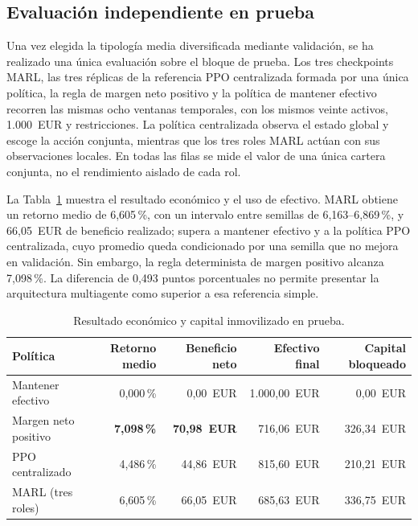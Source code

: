 \subsection{Evaluación independiente en prueba}

Una vez elegida la tipología media diversificada mediante validación, se ha realizado una única evaluación sobre el bloque de prueba. Los tres checkpoints MARL, las tres réplicas de la referencia PPO centralizada formada por una única política, la regla de margen neto positivo y la política de mantener efectivo recorren las mismas ocho ventanas temporales, con los mismos veinte activos, 1.000~EUR y restricciones. La política centralizada observa el estado global y escoge la acción conjunta, mientras que los tres roles MARL actúan con sus observaciones locales. En todas las filas se mide el valor de una única cartera conjunta, no el rendimiento aislado de cada rol.

La Tabla~\ref{tab:prueba-final-marl} muestra el resultado económico y el uso de efectivo. MARL obtiene un retorno medio de 6,605\,\%, con un intervalo entre semillas de 6,163--6,869\,\%, y 66,05~EUR de beneficio realizado; supera a mantener efectivo y a la política PPO centralizada, cuyo promedio queda condicionado por una semilla que no mejora en validación. Sin embargo, la regla determinista de margen positivo alcanza 7,098\,\%. La diferencia de 0,493 puntos porcentuales no permite presentar la arquitectura multiagente como superior a esa referencia simple.

\begin{table}[htbp]
\centering
\small
\begin{tabularx}{\textwidth}{>{\raggedright\arraybackslash}X r r r r}
\toprule
Política & Retorno medio & Beneficio neto & Efectivo final & Capital bloqueado \\
\midrule
Mantener efectivo & 0,000\,\% & 0,00~EUR & 1.000,00~EUR & 0,00~EUR \\
Margen neto positivo & \textbf{7,098\,\%} & \textbf{70,98~EUR} & 716,06~EUR & 326,34~EUR \\
PPO centralizado & 4,486\,\% & 44,86~EUR & 815,60~EUR & 210,21~EUR \\
MARL (tres roles) & 6,605\,\% & 66,05~EUR & 685,63~EUR & 336,75~EUR \\
\bottomrule
\end{tabularx}
\caption{Resultado económico y capital inmovilizado en prueba.}
\label{tab:prueba-final-marl}
\end{table}

